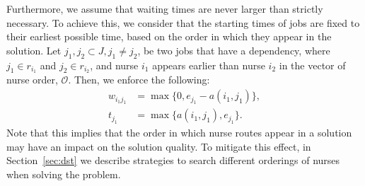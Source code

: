 \documentclass[a4paper,11pt,authoryear]{elsarticle}
\begin{document}
\noindent Furthermore, we assume that waiting times are never larger than strictly necessary. To achieve this, we consider that the starting times of jobs are fixed to their earliest possible time, based on the order in which they appear in the solution. Let $j_1, j_2 \subset J, j_1 \neq j_2$, be two jobs that have a dependency, where $j_1 \in r_{i_1}$ and $j_2 \in r_{i_2}$, and nurse $i_1$ appears earlier than nurse $i_2$ in the vector of nurse order, $\mathcal{O}$. Then, we enforce the following: 
\begin{align}
	w_{i_1 j_1} &= \max \{0, e_{j_1} - a(i_1,j_1)\}, \\ 
		t_{j_1} &= \max \{ a(i_1,j_1), e_{j_1} \}.\label{eq:earliestpossiblestartassumption}
\end{align}
\noindent Note that this implies that the order in which nurse routes appear in a solution may have an impact on the solution quality. To mitigate this effect, in Section~\ref{sec:dst} we describe strategies to search different orderings of nurses when solving the problem.

\end{document}
